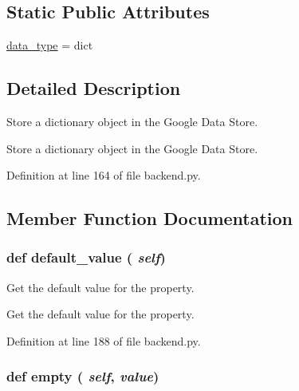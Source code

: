 \subsection*{Static Public Attributes}
\begin{DoxyCompactItemize}
\item 
\hyperlink{classbackend_1_1_dict_property_ac2ad7f431e3446fddcd9b6b9f93c4c14}{data\_\-type} = dict
\end{DoxyCompactItemize}


\subsection{Detailed Description}
Store a dictionary object in the Google Data Store. \begin{DoxyVerb}Store a dictionary object in the Google Data Store.\end{DoxyVerb}
 

Definition at line 164 of file backend.py.

\subsection{Member Function Documentation}
\hypertarget{classbackend_1_1_dict_property_a64bfffc058d933b3b0599f5bc7c049d1}{
\subsubsection[{default\_\-value}]{\setlength{\rightskip}{0pt plus 5cm}def default\_\-value ( {\em self})}}
\label{classbackend_1_1_dict_property_a64bfffc058d933b3b0599f5bc7c049d1}


Get the default value for the property. \begin{DoxyVerb}Get the default value for the property.\end{DoxyVerb}
 

Definition at line 188 of file backend.py.\hypertarget{classbackend_1_1_dict_property_aad7084fad37d1cf9b41a738ecfbbd249}{
\subsubsection[{empty}]{\setlength{\rightskip}{0pt plus 5cm}def empty ( {\em self}, \/   {\em value})}}
\label{classbackend_1_1_dict_property_aad7084fad37d1cf9b41a738ecfbbd249}


